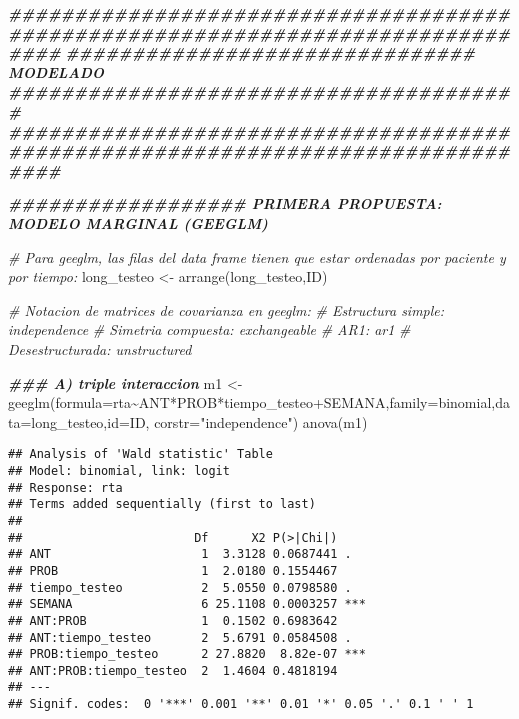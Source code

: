 \documentclass[
]{article}
\newenvironment{Shaded}{\begin{snugshade}}{\end{snugshade}}
\newcommand{\AttributeTok}[1]{\textcolor[rgb]{0.77,0.63,0.00}{#1}}
\newcommand{\CommentTok}[1]{\textcolor[rgb]{0.56,0.35,0.01}{\textit{#1}}}
\newcommand{\DocumentationTok}[1]{\textcolor[rgb]{0.56,0.35,0.01}{\textbf{\textit{#1}}}}
\newcommand{\FunctionTok}[1]{\textcolor[rgb]{0.00,0.00,0.00}{#1}}
\newcommand{\NormalTok}[1]{#1}
\newcommand{\OtherTok}[1]{\textcolor[rgb]{0.56,0.35,0.01}{#1}}
\newcommand{\SpecialCharTok}[1]{\textcolor[rgb]{0.00,0.00,0.00}{#1}}
\newcommand{\StringTok}[1]{\textcolor[rgb]{0.31,0.60,0.02}{#1}}
\begin{document}
\begin{Shaded}
\begin{Highlighting}[]
\DocumentationTok{\#\#\#\#\#\#\#\#\#\#\#\#\#\#\#\#\#\#\#\#\#\#\#\#\#\#\#\#\#\#\#\#\#\#\#\#\#\#\#\#\#\#\#\#\#\#\#\#\#\#\#\#\#\#\#\#\#\#\#\#\#\#\#\#\#\#\#\#\#\#\#\#\#\#\#\#\#\#\#\#}
\DocumentationTok{\#\#\#\#\#\#\#\#\#\#\#\#\#\#\#\#\#\#\#\#\#\#\#\#\#\#\#\#\#\#\# MODELADO \#\#\#\#\#\#\#\#\#\#\#\#\#\#\#\#\#\#\#\#\#\#\#\#\#\#\#\#\#\#\#\#\#\#\#\#\#\#\#}
\DocumentationTok{\#\#\#\#\#\#\#\#\#\#\#\#\#\#\#\#\#\#\#\#\#\#\#\#\#\#\#\#\#\#\#\#\#\#\#\#\#\#\#\#\#\#\#\#\#\#\#\#\#\#\#\#\#\#\#\#\#\#\#\#\#\#\#\#\#\#\#\#\#\#\#\#\#\#\#\#\#\#\#\#}

\DocumentationTok{\#\#\#\#\#\#\#\#\#\#\#\#\#\#\#\#\#\# PRIMERA PROPUESTA: MODELO MARGINAL (GEEGLM)}

\CommentTok{\# Para geeglm, las filas del data frame tienen que estar ordenadas por paciente y por tiempo:}
\NormalTok{long\_testeo }\OtherTok{\textless{}{-}} \FunctionTok{arrange}\NormalTok{(long\_testeo,ID)}

\CommentTok{\# Notacion de matrices de covarianza en geeglm:}
\CommentTok{\# Estructura simple: independence}
\CommentTok{\# Simetria compuesta: exchangeable}
\CommentTok{\# AR1: ar1}
\CommentTok{\# Desestructurada: unstructured}

\DocumentationTok{\#\#\# A) triple interaccion}
\NormalTok{m1 }\OtherTok{\textless{}{-}} \FunctionTok{geeglm}\NormalTok{(}\AttributeTok{formula=}\NormalTok{rta}\SpecialCharTok{\textasciitilde{}}\NormalTok{ANT}\SpecialCharTok{*}\NormalTok{PROB}\SpecialCharTok{*}\NormalTok{tiempo\_testeo}\SpecialCharTok{+}\NormalTok{SEMANA,}\AttributeTok{family=}\NormalTok{binomial,}\AttributeTok{data=}\NormalTok{long\_testeo,}\AttributeTok{id=}\NormalTok{ID,}
             \AttributeTok{corstr=}\StringTok{"independence"}\NormalTok{)}
\FunctionTok{anova}\NormalTok{(m1)}
\end{Highlighting}
\end{Shaded}

\begin{verbatim}
## Analysis of 'Wald statistic' Table
## Model: binomial, link: logit
## Response: rta
## Terms added sequentially (first to last)
## 
##                        Df      X2 P(>|Chi|)    
## ANT                     1  3.3128 0.0687441 .  
## PROB                    1  2.0180 0.1554467    
## tiempo_testeo           2  5.0550 0.0798580 .  
## SEMANA                  6 25.1108 0.0003257 ***
## ANT:PROB                1  0.1502 0.6983642    
## ANT:tiempo_testeo       2  5.6791 0.0584508 .  
## PROB:tiempo_testeo      2 27.8820  8.82e-07 ***
## ANT:PROB:tiempo_testeo  2  1.4604 0.4818194    
## ---
## Signif. codes:  0 '***' 0.001 '**' 0.01 '*' 0.05 '.' 0.1 ' ' 1
\end{verbatim}
\end{document}
